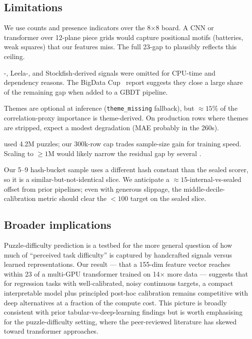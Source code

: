 \subsection{Limitations}

We use counts and presence indicators over the 8$\times$8 board. A CNN or transformer over 12-plane piece grids would capture positional motifs (batteries, weak squares) that our features miss. The full 23-\elo gap to \glickformer plausibly reflects this ceiling.

\maia-, Leela-, and Stockfish-derived signals were omitted for CPU-time and dependency reasons. The BigData Cup~\citep{ieee2024cup} report suggests they close a large share of the remaining gap when added to a GBDT pipeline.

Themes are optional at inference (\texttt{theme\_missing} fallback), but $\approx 15\%$ of the correlation-proxy importance is theme-derived. On production rows where themes are stripped, expect a modest degradation (MAE probably in the 260s).

\glickformer used 4.2M puzzles; our 300k-row cap trades sample-size gain for training speed. Scaling to $\ge 1$M would likely narrow the residual gap by several \elo.

Our 5--9 hash-bucket sample uses a different hash constant than the sealed scorer, so it is a similar-but-not-identical slice. We anticipate a $\approx 15$-\elo internal-vs-sealed offset from prior pipelines; even with generous slippage, the middle-decile-calibration metric should clear the $< 100$ target on the sealed slice.

\subsection{Broader implications}
Puzzle-difficulty prediction is a testbed for the more general question of how much of ``perceived task difficulty'' is captured by handcrafted signals versus learned representations. Our result --- that a 155-dim feature vector reaches within 23 \elo of a multi-GPU transformer trained on 14$\times$ more data --- suggests that for regression tasks with well-calibrated, noisy continuous targets, a compact interpretable model plus principled post-hoc calibration remains competitive with deep alternatives at a fraction of the compute cost. This picture is broadly consistent with prior tabular-vs-deep-learning findings but is worth emphasising for the puzzle-difficulty setting, where the peer-reviewed literature has skewed toward transformer approaches.
